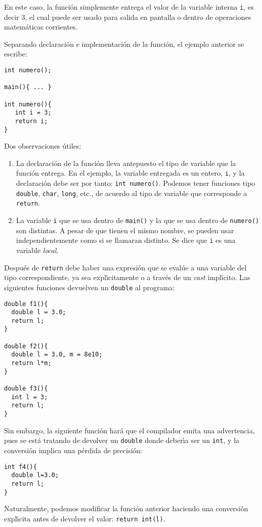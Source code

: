 En este caso, la funci{\'o}n simplemente entrega el valor de la
variable interna \verb+i+, es decir 3, el cual puede ser usado para
salida en pantalla o dentro de operaciones matem{\'a}ticas corrientes.

Separando declaraci\'on e implementaci\'on de la funci\'on, el ejemplo
anterior se escribe:
\begin{verbatim}
int numero();

main(){ ... }

int numero(){
   int i = 3;
   return i;
}
\end{verbatim}


Dos observaciones {\'u}tiles:
\begin{enumerate}
\item[a)] La declaraci{\'o}n de la funci{\'o}n lleva antepuesto el tipo
de variable que la funci{\'o}n entrega. En el ejemplo, la variable
entregada es un entero, \verb+i+, y la declaraci{\'o}n debe ser por
tanto: \verb+int numero()+. Podemos tener funciones tipo
\verb+double+, \verb+char+, \verb+long+, etc., de acuerdo al tipo de
variable que corresponde a \verb+return+. 
\item[b)] La variable \verb+i+ que se usa dentro de \verb+main()+ y
la que se usa dentro de \verb+numero()+ son distintas. A pesar de que
tienen el mismo nombre, se pueden usar independientemente como si se
llamaran distinto. Se dice que \verb+i+ es una variable {\em local}. 
\end{enumerate}

Despu\'es de \verb+return+ debe haber una expresi\'on que se eval\'ue
a una variable del tipo correspondiente, ya sea expl\'{\i}citamente o
a trav\'es de un {\it cast\/} impl\'{\i}cito. Las siguientes funciones
devuelven un \verb+double+ al programa:
\begin{verbatim}
double f1(){
  double l = 3.0;
  return l;
}

double f2(){
  double l = 3.0, m = 8e10;
  return l*m;
}

double f3(){
  int l = 3;
  return l;
}
\end{verbatim}

Sin embargo, la siguiente funci\'on har\'a que el compilador emita una
advertencia, pues se est\'a tratando de devolver un \verb+double+
donde deber\'{\i}a ser un \verb+int+, y la conversi\'on implica una
p\'erdida de precisi\'on:
\begin{verbatim}
int f4(){
  double l=3.0;
  return l;
}
\end{verbatim}
Naturalmente, podemos modificar la funci\'on anterior haciendo una
conversi\'on expl\'{\i}cita antes de devolver el valor: 
\verb+return int(l)+. 

